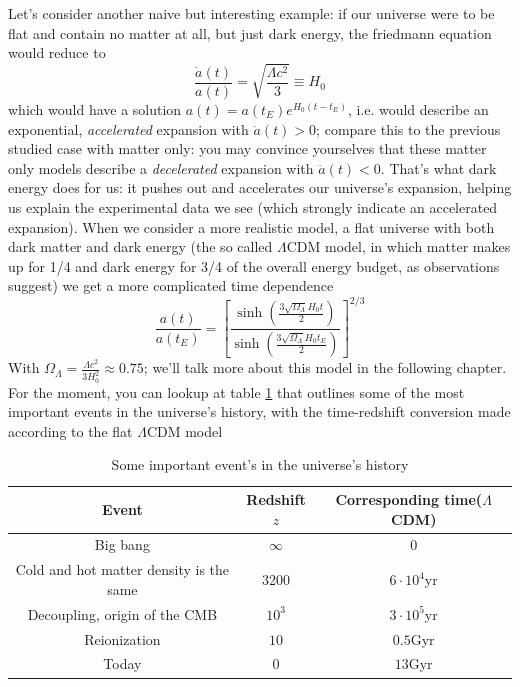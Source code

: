 \documentclass[11pt, a4paper,oneside,openright]{book}
\numberwithin{equation}{section}
\begin{document}
Let's consider another naive but interesting example: if our universe were to be flat and contain no matter at all, but just dark energy, the friedmann equation would reduce to
\begin{equation}
\frac{\dot{a}(t)}{a(t)}=\sqrt{\frac{\Lambda c^2}{3}}\equiv H_0
\end{equation}
which would have a solution $a(t)=a(t_E)e^{H_0(t-t_E)}$, i.e. would describe an exponential, \textit{accelerated} expansion with $\ddot{a}(t)>0$; compare this to the previous studied case with matter only: you may convince yourselves that these matter only models describe a \textit{decelerated} expansion with $\ddot{a}(t)<0$. That's what dark energy does for us: it pushes out and accelerates our universe's expansion, helping us explain the experimental data we see (which strongly indicate an accelerated expansion). When we consider a more realistic model, a flat universe with both dark matter and dark energy (the so called $\Lambda$CDM model, in which matter makes up for 1/4 and dark energy for 3/4 of the overall energy budget, as observations suggest) we get a more complicated time dependence 
\begin{equation}
\frac{a(t)}{a(t_E)}=\left[\frac{\sinh{\left(\frac{3\sqrt{\Omega_\Lambda}H_0 t}{2}\right)}}{\sinh{\left(\frac{3\sqrt{\Omega_\Lambda}H_0 t_E}{2}\right)}}\right]^{2/3}
\end{equation}
With $\Omega_\Lambda=\frac{\Lambda c^2}{3H_0^2}\approx 0.75$; we'll talk more about this model in the following chapter. For the moment, you can lookup at table \ref{timez} that outlines some of the most important events in the universe's history, with the time-redshift conversion made according to the flat $\Lambda$CDM model

\begin{table}[htdp]
\begin{center}
\begin{tabular}{|c|c|c|} \hline
\textbf{Event} & \textbf{Redshift}$z$ & \textbf{Corresponding time}($\Lambda$CDM) \\ \hline
Big bang & $\infty$ & 0 \\ \hline
Cold and hot matter density is the same & 3200 & $6\cdot 10^4$yr \\ \hline
Decoupling, origin of the CMB & $10^3$ & $3\cdot 10^5$yr \\ \hline
Reionization & $10$ & $0.5$Gyr \\ \hline
Today& 0 & $13$Gyr \\ \hline
\end{tabular}
\end{center}
\caption{Some important event's in the universe's history}
\label{timez}
\end{table}
\end{document}
